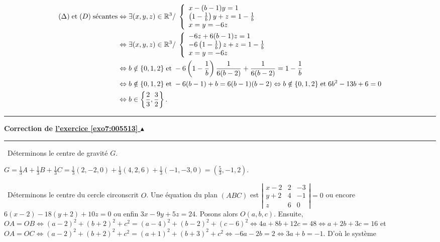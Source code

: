 \documentclass[11pt,a4paper]{article}
\newcommand{\Rr}{\mathbb{R}} \newcommand{\R}{\mathbb{R}}
\newcounter{exo}
\newcommand{\correction}[1]{\hypertarget{cor7:#1}{}\label{cor7:#1}{\bf Correction de \hyperlink{exo7:#1}{l'exercice \ref{exo7:#1} $\blacktriangle$}}\vspace{1mm}\hrule\vspace{1mm}}
\newcommand{\fincorrection}{\vspace{1mm}\hrule\vspace*{7mm}}
\begin{document}
\begin{align*}\ensuremath
(\Delta)\;\text{et}\;(D)\;\text{sécantes}&\Leftrightarrow\exists(x,y,z)\in\Rr^3/\;\left\{
\begin{array}{l}
x-(b-1)y=1\\
\left(1-\frac{1}{b}\right)y+z=1-\frac{1}{b}\\
x=y=-6z
\end{array}
\right.\\
&\Leftrightarrow\exists(x,y,z)\in\Rr^3/\;\left\{
\begin{array}{l}
-6z+6(b-1)z=1\\
-6\left(1-\frac{1}{b}\right)z+z=1-\frac{1}{b}\\
x=y=-6z
\end{array}
\right.\\
 &\Leftrightarrow b\notin\{0,1,2\}\;\text{et}\;-6\left(1-\frac{1}{b}\right)\frac{1}{6(b-2)}+\frac{1}{6(b-2)}=1-\frac{1}{b}\\
 &\Leftrightarrow b\notin\{0,1,2\}\;\text{et}\;-6(b-1)+b=6(b-1)(b-2)\Leftrightarrow b\notin\{0,1,2\}\;\text{et}\;6b^2-13b+6=0\\
 &\Leftrightarrow b\in\left\{\frac{2}{3},\frac{3}{2}\right\}.
\end{align*}

\begin{center}
\end{center}
\fincorrection
\correction{005513}
\textbullet~Déterminons le centre de gravité $G$.

\begin{center}
$G=\frac{1}{3}A+\frac{1}{3}B+\frac{1}{3}C=\frac{1}{3}(2,-2,0)+\frac{1}{3}(4,2,6)+\frac{1}{3}(-1,-3,0)=\left(\frac{5}{3},-1,2\right)$.
\end{center}
\textbullet~Déterminons le centre du cercle circonscrit $O$. Une équation du plan $(ABC)$ est $\left|
\begin{array}{ccc}
x-2&2&-3\\
y+2&4&-1\\
z&6&0
\end{array}
\right|=0$ ou encore $6(x-2)-18(y+2)+10z=0$ ou enfin $3x-9y+5z=24$. Posons alors $O(a,b,c)$.
Ensuite, $OA=OB\Leftrightarrow(a-2)^2+(b+2)^2+c^2=(a-4)^2+(b-2)^2+(c-6)^2\Leftrightarrow4a+8b+12c=48\Leftrightarrow a+2b+3c=16$ et 
$OA=OC\Leftrightarrow(a-2)^2+(b+2)^2+c^2=(a+1)^2+(b+3)^2+c^2\Leftrightarrow-6a-2b=2\Leftrightarrow3a+b=-1$.
D'où le système
\end{document}
